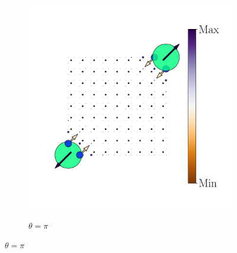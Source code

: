 \begin{figure}[h!]
\begin{minipage}[h!]{1.1\textwidth}
\begin{subfigure}[b!]{0.2 \textwidth}
             \label{}
         \end{subfigure}\hspace*{-0.5em}
          \begin{subfigure}[b!]{0.2 \textwidth}
             \caption*{$\theta = \pi$}
             \includegraphics[width=\textwidth]{Imagenes/Resultados_pump_Cuadrado/xy/hoti_pomp_xy_pos5.pdf}
             \label{}
         \end{subfigure}\hspace*{-0.5em}
     \end{minipage}\vspace*{-1em}
     

\end{figure}

